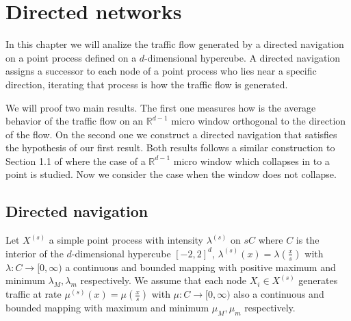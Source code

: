 

\chapter{Directed networks}
In this chapter we will analize the traffic flow generated by a directed navigation on a point process defined on a $d$-dimensional hypercube. A directed navigation assigns a successor to each node of a point process who lies near a specific direction, iterating that process is how the traffic flow is generated. 

We will proof two main results. The first one measures how is the average behavior of the traffic flow on an $\mathbb{R}^{d-1}$ micro window orthogonal to the direction of the flow. On the second one we construct a directed navigation that satisfies the hypothesis of our first result. Both results follows a similar construction to Section 1.1 of \cite{WIAS} where the case of a $\mathbb{R}^{d-1}$ micro window which collapses in to a point is studied. Now we consider the case when the window does not collapse. 

\section{Directed navigation}
Let $X^{(s)}$ a simple point process with intensity $\lambda^{(s)}$ on $sC$ where $C$ is the interior of the $d$-dimensional hypercube $[-2, 2]^d$, $\lambda^{(s)}(x)=\lambda(\frac{x}{s})$ with \\$\lambda: C\rightarrow [0,\infty)$ a continuous and bounded mapping with positive maximum and minimum $\lambda_M, \lambda_m$ respectively. We assume that each node $X_i\in X^{(s)}$ generates traffic at rate $\mu^{(s)}(x)=\mu(\frac{x}{s})$ with $\mu: C\rightarrow [0,\infty)$ also a continuous and bounded mapping with maximum and minimum $\mu_M, \mu_m$ respectively.

